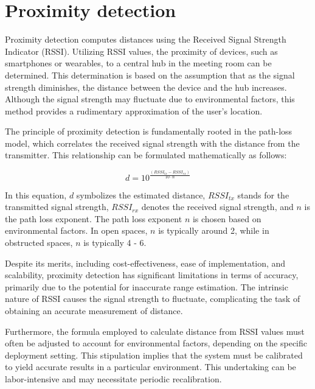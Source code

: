 \section{Proximity detection}\label{sec:proximity_detection}
Proximity detection computes distances using the Received Signal Strength Indicator (RSSI).
Utilizing RSSI values, the proximity of devices, such as smartphones or wearables, to a central hub in the meeting room can be determined. 
This determination is based on the assumption that as the signal strength diminishes, the distance between the device and the hub increases. 
Although the signal strength may fluctuate due to environmental factors, this method provides a rudimentary approximation of the user's location.\cite{spachosBLEBeaconsIndoor2020}

The principle of proximity detection is fundamentally rooted in the path-loss model, which correlates the received signal strength with the distance from the transmitter. This relationship can be formulated mathematically as follows:

$$
d = 10^{ \frac{(RSSI_{tx} - RSSI_{rx})}{10 \cdot n}}
$$\cite{spachosBLEBeaconsIndoor2020}

In this equation, \(d\) symbolizes the estimated distance, \(RSSI_{tx}\) stands for the transmitted signal strength, \(RSSI_{rx}\) denotes the received signal strength, and \(n\) is the path loss exponent. The path loss exponent \(n\) is chosen based on environmental factors. In open spaces, \(n\) is typically around 2, while in obstructed spaces, \(n\) is typically 4 - 6.\cite{spachosBLEBeaconsIndoor2020, mathuranathanLogDistancePath2013}

Despite its merits, including cost-effectiveness, ease of implementation, and scalability, proximity detection has significant limitations in terms of accuracy, primarily due to the potential for inaccurate range estimation. The intrinsic nature of RSSI causes the signal strength to fluctuate, complicating the task of obtaining an accurate measurement of distance.\cite{spachosBLEBeaconsIndoor2020}

Furthermore, the formula employed to calculate distance from RSSI values must often be adjusted to account for environmental factors, depending on the specific deployment setting. This stipulation implies that the system must be calibrated to yield accurate results in a particular environment. This undertaking can be labor-intensive and may necessitate periodic recalibration.\cite{spachosBLEBeaconsIndoor2020}

